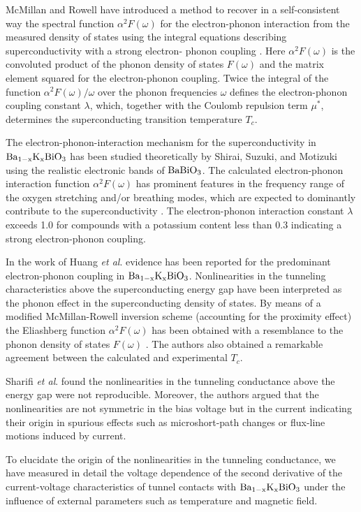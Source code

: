 \documentclass[twocolumn,amsmath,floats,showpacs,nofootinbib]{revtex4}
\begin{document}
McMillan and Rowell \cite{10} have introduced a method to recover in a self-consistent way the spectral function $\alpha^2F(\omega)$ for the electron-phonon interaction from the measured density of states using the integral equations describing superconductivity with a strong electron- phonon coupling \cite{11}. Here $\alpha^2F(\omega)$ is the convoluted product of the phonon density of states $F(\omega)$ and the matrix element
squared for the electron-phonon coupling. Twice the integral of the function $\alpha^2F(\omega)/ \omega$ over the phonon frequencies $\omega$ defines the electron-phonon coupling constant $\lambda$, which, together with the Coulomb repulsion term $\mu^*$, determines the superconducting transition temperature $T_c$.

The electron-phonon-interaction mechanism for the superconductivity in $\rm Ba_{1-x}K_xBiO_3$ has been studied theoretically by Shirai, Suzuki, and Motizuki \cite{12} using the realistic electronic bands of $\rm BaBiO_3$. The calculated electron-phonon interaction function $\alpha^2F(\omega)$ has prominent features in the frequency range of the oxygen stretching and/or breathing modes, which are expected to dominantly contribute to the superconductivity \cite{12}. The electron-phonon interaction constant $\lambda$ exceeds 1.0 for compounds with a potassium content less than 0.3 indicating a strong electron-phonon coupling.

In the work of Huang \emph{et al}. \cite{7} evidence has been reported for the predominant electron-phonon coupling in $\rm Ba_{1-x}K_xBiO_3$. Nonlinearities in the tunneling characteristics above the superconducting energy gap have been interpreted as the phonon effect in the superconducting density of states. By means of a modified McMillan-Rowell inversion scheme (accounting for the proximity effect) the Eliashberg function $\alpha^2F(\omega)$ has been obtained with a resemblance to the phonon density of states $F(\omega)$ \cite{13}. The authors also obtained a remarkable agreement between the calculated and experimental $T_c$.

Sharifi \emph{et al}. \cite{8} found the nonlinearities in the tunneling conductance above the energy gap were not reproducible. Moreover, the authors argued that the nonlinearities are not symmetric in the bias voltage but in the current indicating their origin in spurious effects such as microshort-path changes or flux-line motions induced by current.

To elucidate the origin of the nonlinearities in the tunneling conductance, we have measured in detail the voltage dependence of the second derivative of the current-voltage characteristics of tunnel contacts with $\rm Ba_{1-x}K_xBiO_3$ under the influence of external parameters such as temperature and magnetic field.
\end{document}
